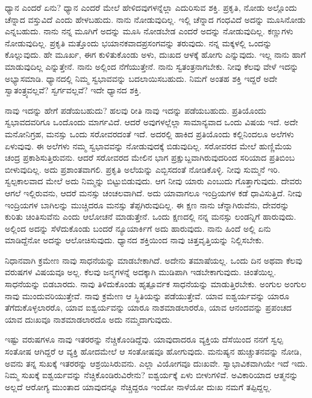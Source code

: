ಧ್ಯಾನ ಎಂದರೆ ಏನು? ಧ್ಯಾನ ಎಂದರೆ ಮೇಲೆ ಹೇಳಿದವುಗಳನ್ನೆಲ್ಲಾ ಎದುರಿಸುವ ಶಕ್ತಿ. ಪ್ರಕೃತಿ, ನೋಡು ಅಲ್ಲೊಂದು ಚೆನ್ನಾದ ವಸ್ತುವಿದೆ ಎಂದು ಹೇಳಬಹುದು. ನಾನು ನೋಡುವುದಿಲ್ಲ. ಇಲ್ಲಿ ಚೆನ್ನಾದ ಗಂಧವಿದೆ ಅದನ್ನು ಮೂಸಿನೋಡು ಎನ್ನಬಹುದು. ನಾನು ನನ್ನ ಮೂಗಿಗೆ ಅದನ್ನು ಮೂಸಿ ನೋಡಬೇಡ ಎಂದರೆ ಅದನ್ನು ನೋಡುವುದಿಲ್ಲ. ಕಣ್ಣುಗಳು ನೋಡುವುದಿಲ್ಲ. ಪ್ರಕೃತಿ ಮತ್ತೊಂದು ಭಯಾನಕವಾದ\break ಪ್ರಸಂಗವನ್ನು ತರುವುದು. ನನ್ನ ಮಕ್ಕಳಲ್ಲಿ ಒಂದನ್ನು ಕೊಲ್ಲುವುದು. ಹೇ ಮೂರ್ಖ, ಈಗ ಕುಳಿತುಕೊಂಡು ಅಳು, ದುಃಖದ ಆಳಕ್ಕೆ ಹೋಗು ಎನ್ನುವುದು. ಇಲ್ಲ ನಾನು ಹಾಗೆ ಮಾಡುವುದಿಲ್ಲ ಎನ್ನುತ್ತೇನೆ. ನಾನು ಅಲ್ಲಿಂದ ನೆಗೆಯುತ್ತೇನೆ. ನಾನು ಸ್ವತಂತ್ರನಾಗಬೇಕು. ನೀವು ಕೆಲವು ವೇಳೆ ಇದನ್ನು ಅಭ್ಯಾಸಮಾಡಿ. ಧ್ಯಾನದಲ್ಲಿ ನಿಮ್ಮ ಸ್ವಭಾವವನ್ನು ಬದಲಾಯಿಸಬಹುದು. ನಿಮಗೆ ಅಂತಹ ಶಕ್ತಿ ಇದ್ದರೆ ಅದೇ ಸ್ವಾತಂತ್ರ್ಯವಲ್ಲವೆ? ಸ್ವರ್ಗವಲ್ಲವೆ? ಇದೇ ಧ್ಯಾನದ ಶಕ್ತಿ.

ನಾವು ಇದನ್ನು ಹೇಗೆ ಪಡೆಯಬಹುದು? ಹಲವು ರೀತಿ ನಾವು ಇದನ್ನು ಪಡೆಯಬಹುದು. ಪ್ರತಿಯೊಂದು ಸ್ವಭಾವದವರಿಗೂ ಒಂದೊಂದು ಮಾರ್ಗವಿದೆ. ಆದರೆ ಅವುಗಳಲ್ಲೆಲ್ಲಾ ಸಾಮಾನ್ಯವಾದ ಒಂದು ವಿಷಯ ಇದೆ. ಅದೇ ಮನೋನಿಗ್ರಹ, ಮನಸ್ಸು ಒಂದು ಸರೋವರದಂತೆ ಇದೆ. ಅದರಲ್ಲಿ ಹಾಕಿದ ಪ್ರತಿಯೊಂದು ಕಲ್ಲಿನಿಂದಲೂ ಅಲೆಗಳು ಏಳುವುವು. ಈ ಅಲೆಗಳು ನಮ್ಮ ಸ್ವಭಾವವನ್ನು ನೋಡುವುದಕ್ಕೆ ಬಿಡುವುದಿಲ್ಲ. ಸರೋವರದ ಮೇಲೆ ಹುಣ್ಣಿಮೆಯ ಚಂದ್ರ ಪ್ರಕಾಶಿಸುತ್ತಿರುವನು. ಆದರೆ ಸರೋವರದ ಮೇಲಿನ ಭಾಗ ಪ್ರಕ್ಷುಬ್ದವಾಗಿರುವುದರಿಂದ ಸರಿಯಾದ ಪ್ರತಿಬಿಂಬ ಬೀಳುವುದಿಲ್ಲ. ಅದು ಪ್ರಶಾಂತವಾಗಲಿ. ಪ್ರಕೃತಿ ಅಲೆಯನ್ನು ಎಬ್ಬಿಸದಂತೆ ನೋಡಿಕೊಳ್ಳಿ. ನೀವು ಸುಮ್ಮನೆ ಇರಿ. ಸ್ವಲ್ಪಕಾಲವಾದ ಮೇಲೆ ಅದು ನಿಮ್ಮನ್ನು ಬಿಟ್ಟುಬಿಡುವುದು. ಆಗ ನೀವು ಯಾರು ಎಂಬುದು ಗೊತ್ತಾಗುವುದು. ದೇವರು ಆಗಲೆ ಇಲ್ಲಿರುವನು, ಆದರೆ ಮನಸ್ಸು ಚಂಚಲವಾಗಿದೆ. ಅದು ಯಾವಾಗಲೂ ಇಂದ್ರಿಯಗಳ ಕಡೆ ಧಾವಿಸುತ್ತಿದೆ. ನೀವು ಇಂದ್ರಿಯಗಳ ಬಾಗಿಲನ್ನು ಮುಚ್ಚಿದರೂ ಮನಸ್ಸು ತೆಪ್ಪಗಿರುವುದಿಲ್ಲ. ಈ ಕ್ಷಣ ನಾನು ಚೆನ್ನಾಗಿರುವೆನು, ದೇವರನ್ನು ಕುರಿತು ಚಿಂತಿಸುವೆನು ಎಂದು ಆಲೋಚನೆ ಮಾಡುತ್ತೇನೆ. ಒಂದು ಕ್ಷಣದಲ್ಲಿ ನನ್ನ ಮನಸ್ಸು ಲಂಡನ್ನಿಗೆ ಹಾರುವುದು. ಅಲ್ಲಿಂದ ಅದನ್ನು ಸೆಳೆದುಕೊಂಡು ಬಂದರೆ ನ್ಯೂಯಾರ್ಕಿಗೆ ಅದು ಹಾರುವುದು. ನಾನು ಹಿಂದೆ ಅಲ್ಲಿ ಏನು ಮಾಡಿದ್ದೆನೋ ಅದನ್ನು ಆಲೋಚಿಸುವುದು. ಧ್ಯಾನದ ಶಕ್ತಿಯಿಂದ ನಾವು ಚಿತ್ತವೃತ್ತಿಯನ್ನು ನಿಲ್ಲಿಸಬೇಕು.

ನಿಧಾನವಾಗಿ ಕ್ರಮೇಣ ನಾವು ಸಾಧನೆಯನ್ನು ಮಾಡಬೇಕಾಗಿದೆ. ಅದೇನು ತಮಾಷೆಯಲ್ಲ. ಒಂದು ದಿನ ಅಥವಾ ಕೆಲವು ವರುಷಗಳ ವಿಷಯವೂ ಅಲ್ಲ. ಕೆಲವು ಜನ್ಮಗಳನ್ನೆ ಅದಕ್ಕಾಗಿ ಮುಡಿಪಾಗಿ ಇಡಬೇಕಾಗುವುದು. ಚಿಂತೆಯಿಲ್ಲ. ಸಾಧನೆಯನ್ನು ಬಿಡಬಾರದು. ನಾವು ತಿಳಿದುಕೊಂಡು ಹೃತ್ಪೂರ್ವಕ ಸಾಧನೆಯನ್ನು ಮಾಡುತ್ತಿರಬೇಕು. ಅಂಗುಲ ಅಂಗುಲ ನಾವು ಮುಂದುವರಿಯುತ್ತೇವೆ. ನಾವು ಕ್ರಮೇಣ ಆ ಸ್ಥಿತಿಯನ್ನು ಪಡೆಯುತ್ತೇವೆ. ಯಾವ ಐಶ್ವರ್ಯವನ್ನು ಯಾರೂ ತೆಗೆದುಕೊಳ್ಳಲಾರರೊ, ಯಾವ ಐಶ್ವರ್ಯವನ್ನು ಯಾರೂ ನಾಶಮಾಡಲಾರರೊ, ಯಾವ ಆನಂದವನ್ನು ಪ್ರಪಂಚದ ಯಾವ ದುಃಖವೂ ನಾಶಮಾಡಲಾರದೊ ಅದು ನಮ್ಮದಾಗುವುದು.

ಇಷ್ಟು ವರುಷಗಳೂ ನಾವು ಇತರರನ್ನು ನೆಚ್ಚಿಕೊಂಡಿದ್ದೆವು. ಯಾವುದಾದರೂ ವ್ಯಕ್ತಿಯ ದೆಸೆಯಿಂದ ನನಗೆ ಸ್ವಲ್ಪ ಸಂತೋಷ ಆಗಿದ್ದರೆ ಆ ವ್ಯಕ್ತಿ ಹೋದಮೇಲೆ ಆ ಸಂತೋಷವೂ ಹೋಗುವುದು. ಮನುಷ್ಯನ ಹುಚ್ಚುತನವನ್ನು ನೋಡಿ, ಅವನು ತನ್ನ ಸುಖಕ್ಕೆ ಇತರರನ್ನು ಆಶ್ರಯಿಸಿರುವನು. ಎಲ್ಲಾ ವಿಯೋಗವೂ ದುಃಖವೇ. ಸ್ವಾಭಾವಿಕವಾಗಿಯೇ ಇದೆ ಇದು. ನಿಮ್ಮ ಸುಖಕ್ಕೆ ಐಶ್ವರ್ಯವನ್ನು ನೆಚ್ಚಿಕೊಂಡಿರುವಿರೇನು? ಐಶ್ವರ್ಯಕ್ಕೆ ಏಳು ಬೀಳುಗಳಿವೆ. ಅವಿಕಾರಿಯಾದ ಆತ್ಮನನ್ನು ಅಲ್ಲದೆ ಆರೋಗ್ಯ ಮುಂತಾದ ಯಾವುದನ್ನೂ ನೆಚ್ಚಿದ್ದರೂ ಇಂದೋ ನಾಳೆಯೋ ದುಃಖ ನಮಗೆ ತಪ್ಪಿದ್ದಲ್ಲ.

